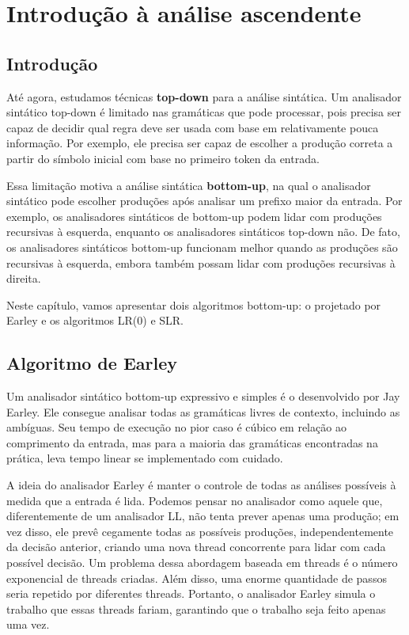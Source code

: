 \chapter{Introdução à análise ascendente}

\section{Introdução}

Até agora, estudamos técnicas \textbf{top-down} para a análise
sintática. Um analisador sintático top-down é limitado nas gramáticas
que pode processar, pois precisa ser capaz de decidir qual regra deve
ser usada com base em relativamente pouca informação. Por exemplo,
ele precisa ser capaz de escolher a produção correta a partir do
símbolo inicial com base no primeiro token da entrada.

Essa limitação motiva a análise sintática \textbf{bottom-up}, na qual
o analisador sintático pode escolher produções após analisar um
prefixo maior da entrada. Por exemplo, os analisadores sintáticos de
bottom-up podem lidar com produções recursivas à esquerda, enquanto
os analisadores sintáticos top-down não. De fato, os analisadores
sintáticos bottom-up funcionam melhor quando as produções são
recursivas à esquerda, embora também possam lidar com produções
recursivas à direita.

Neste capítulo, vamos apresentar dois algoritmos bottom-up: o
projetado por Earley e os algoritmos LR(0) e SLR.

\section{Algoritmo de Earley}

Um analisador sintático bottom-up expressivo e simples é o
desenvolvido por Jay Earley. Ele consegue analisar todas as
gramáticas livres de contexto, incluindo as ambíguas. Seu tempo de
execução no pior caso é cúbico em relação ao comprimento da entrada,
mas para a maioria das gramáticas encontradas na prática, leva tempo
linear se implementado com cuidado.

A ideia do analisador Earley é manter o controle de todas as análises
possíveis à medida que a entrada é lida. Podemos pensar no analisador
como aquele que, diferentemente de um analisador LL, não tenta prever
apenas uma produção; em vez disso, ele prevê cegamente todas as
possíveis produções, independentemente da decisão anterior, criando
uma nova thread concorrente para lidar com cada possível decisão. Um
problema dessa abordagem baseada em threads é o número exponencial de
threads criadas. Além disso, uma enorme quantidade de passos seria
repetido por diferentes threads. Portanto, o analisador Earley simula
o trabalho que essas threads fariam, garantindo que o trabalho seja
feito apenas uma vez.

